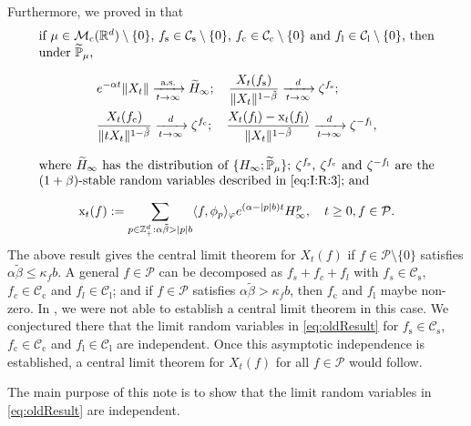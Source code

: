 \documentclass[12pt,a4paper]{amsart}
\theoremstyle{plain}
\theoremstyle{definition}
\numberwithin{equation}{section}
\begin{document}
Furthermore, we proved in \cite[Theorem 1.6]{RenSongSunZhao2019Stable} that
\begin{equation}\label{eq:oldResult}
\begin{minipage}{0.9\textwidth}
if $\mu\in \mathcal M_\mathrm c(\mathbb R^d)\setminus \{0\}$, $f_\mathrm s\in \mathcal C_\mathrm s\setminus\{0\}$, $f_\mathrm c \in \mathcal C_\mathrm c\setminus\{0
\}$ and $f_\mathrm l \in \mathcal C_\mathrm l\setminus\{0\}$, then under $\mathbb {\widetilde P}_\mu$,
\[
\begin{split}
&e^{-\alpha t}\|X_t\| \xrightarrow[t\to \infty]{\text{a.s.}} \widetilde{H}_\infty;
\quad \frac{X_t(f_\mathrm s)}{\|X_t\|^{1-\tilde \beta}} \xrightarrow[t\to \infty]{d} \zeta^{f_\mathrm s};
\\&\frac{X_t(f_\mathrm c)}{\|t X_t\|^{1-\tilde \beta} } \xrightarrow[t\to \infty]{d} \zeta^{f_\mathrm c};
\quad\frac{X_t(f_\mathrm l) - \mathrm x_t(f_\mathrm l)}{\|X_t\|^{1-\tilde \beta}}
\xrightarrow[t\to \infty]{d}
\zeta^{-f_\mathrm l},
\end{split}
\]
where 
$\widetilde H_\infty$ has the distribution of $\{H_{\infty}; \widetilde {\mathbb P}_\mu\}$;
$\zeta^{f_\mathrm s}$, $\zeta^{f_\mathrm c}$ and $\zeta^{-f_\mathrm l}$
are the $(1+\beta)$-stable random variables described in \eqref{eq:I:R:3}; and
\[
\mathrm x_t(f) : = \sum_{p\in \mathbb Z^d_+:\alpha \tilde \beta>|p|b}\langle f,\phi_p\rangle_\varphi e^{(\alpha-|p|b)t}H^p_{\infty},\quad t\geq 0, f\in \mathcal P.
\]
\end{minipage}
\end{equation}
	The above result gives the central limit theorem for $X_t(f)$ if $f\in \mathcal P\setminus\{0\}$ satisfies $\alpha \tilde \beta \leq \kappa_f b$.
A general  $f \in \mathcal P$ can be decomposed as $f_s + f_c + f_l$ with $f_s \in \mathcal C_\mathrm s$, $f_c \in \mathcal C_\mathrm c$ and $f_l \in \mathcal C_\mathrm l$; and if $f\in  \mathcal P$ satisfies $\alpha \tilde \beta > \kappa_f b$, 
then $f_\mathrm c$ and $f_\mathrm l$ maybe non-zero.
	In \cite{RenSongSunZhao2019Stable}, we were not able to
	establish a central limit theorem in this case. We conjectured there that the limit random variables in \eqref{eq:oldResult}
	for $f_\mathrm s\in \mathcal C_\mathrm s$, $f_\mathrm c\in \mathcal C_\mathrm c$ and $f_\mathrm l\in \mathcal C_\mathrm l$ are independent.
	Once this asymptotic independence is established, a central limit theorem  for $ X_t(f)$ for all $f\in  \mathcal P$ would follow.

	The main purpose of this note is to show that
	the limit  random variables in \eqref{eq:oldResult} are independent.
\end{document}
